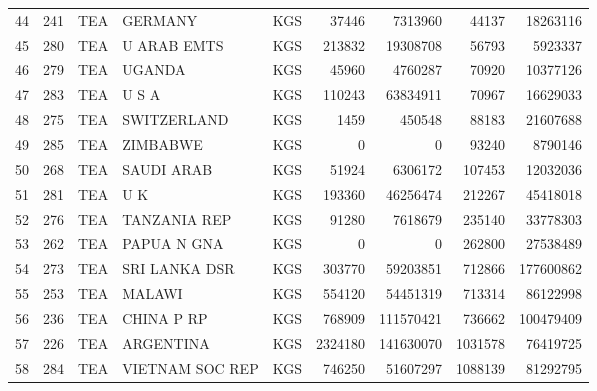 \begin{tabular}{lrlllrrrr}
44 &    241 &       TEA &          GERMANY &  KGS &             37446 &            7313960 &             44137 &           18263116 \\
45 &    280 &       TEA &      U ARAB EMTS &  KGS &            213832 &           19308708 &             56793 &            5923337 \\
46 &    279 &       TEA &           UGANDA &  KGS &             45960 &            4760287 &             70920 &           10377126 \\
47 &    283 &       TEA &            U S A &  KGS &            110243 &           63834911 &             70967 &           16629033 \\
48 &    275 &       TEA &      SWITZERLAND &  KGS &              1459 &             450548 &             88183 &           21607688 \\
49 &    285 &       TEA &         ZIMBABWE &  KGS &                 0 &                  0 &             93240 &            8790146 \\
50 &    268 &       TEA &       SAUDI ARAB &  KGS &             51924 &            6306172 &            107453 &           12032036 \\
51 &    281 &       TEA &              U K &  KGS &            193360 &           46256474 &            212267 &           45418018 \\
52 &    276 &       TEA &     TANZANIA REP &  KGS &             91280 &            7618679 &            235140 &           33778303 \\
53 &    262 &       TEA &      PAPUA N GNA &  KGS &                 0 &                  0 &            262800 &           27538489 \\
54 &    273 &       TEA &    SRI LANKA DSR &  KGS &            303770 &           59203851 &            712866 &          177600862 \\
55 &    253 &       TEA &           MALAWI &  KGS &            554120 &           54451319 &            713314 &           86122998 \\
56 &    236 &       TEA &       CHINA P RP &  KGS &            768909 &          111570421 &            736662 &          100479409 \\
57 &    226 &       TEA &        ARGENTINA &  KGS &           2324180 &          141630070 &           1031578 &           76419725 \\
58 &    284 &       TEA &  VIETNAM SOC REP &  KGS &            746250 &           51607297 &           1088139 &           81292795 \\

\end{tabular}
